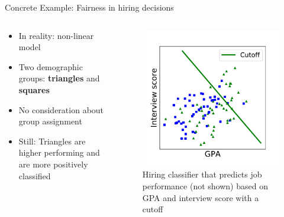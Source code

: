 \begin{frame}{Concrete Example: Fairness in hiring decisions \cite{barocas-hardt-narayanan}}
\begin{columns}
\begin{column}{0.5\textwidth}
   \begin{itemize}
       \item In reality: non-linear model
       \item Two demographic groups: \textbf{triangles} and \textbf{squares}
       \item No consideration about group assignment
       \item Still: Triangles are higher performing and are more positively classified
   \end{itemize}
\end{column}
\begin{column}{0.5\textwidth}  %
    \begin{figure}
        \centering
        \includegraphics[width=.70\textwidth]{presentation/assets/toy_example.pdf}
        \caption{Hiring classifier that predicts job performance (not shown) based on GPA and interview score with a cutoff \cite{barocas-hardt-narayanan}}
        \label{fig:my_label}
    \end{figure}
\end{column}
\end{columns}
\end{frame}

